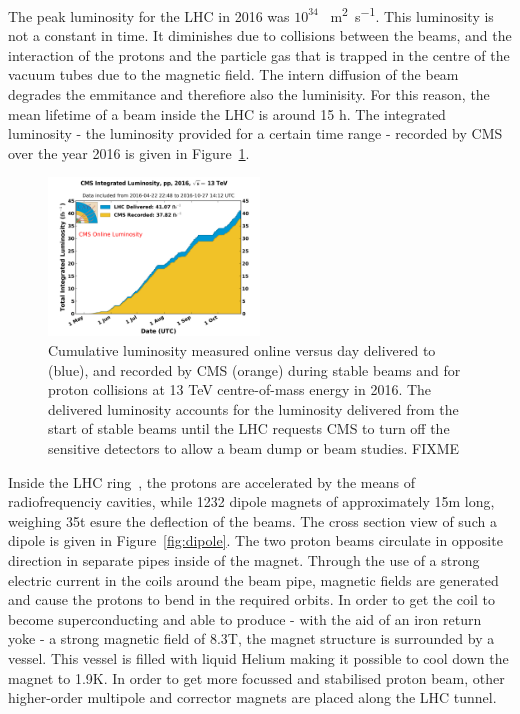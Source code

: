 The peak luminosity for the LHC in 2016 was $10^{34}$ \si{\per\square\meter \per\second }. This luminosity is not a constant in time. It diminishes due to collisions between the beams, and the interaction of the protons and the particle gas that is trapped in the centre of the vacuum tubes due to the magnetic field. The intern diffusion of the beam degrades the emmitance and therefiore also the luminisity. For this reason, the mean lifetime of a beam inside the LHC is around 15 \si{ \hour}. The integrated luminosity - the luminosity provided for a certain time range - recorded by CMS over the year 2016 is given in Figure~\ref{fig:IntLumi}.
 \begin{figure}[h]
	\centering
	\includegraphics[width=0.5\textwidth]{2_ExperimentalSetup/Figures/int_lumi_per_day_cumulative_pp_2016OnlineLumi}
	\caption{Cumulative luminosity measured online versus day delivered to (blue), and recorded by CMS (orange) during stable beams and for proton collisions at 13 TeV centre-of-mass energy in 2016. The delivered luminosity accounts for the luminosity delivered from the start of stable beams until the LHC requests CMS to turn off the sensitive detectors to allow a beam dump or beam studies. FIXME}
	\label{fig:IntLumi}
\end{figure}

 
Inside the LHC ring~\cite{Bruning:782076}, the protons are accelerated by the means of radiofrequenciy cavities, while 1232 dipole magnets of approximately 15\si{ \m} long, weighing 35\si{ \tonne} esure the deflection of the beams. The cross section view of such a dipole is given in Figure~\ref{fig:dipole}. The two proton beams circulate in opposite direction in separate pipes inside of the magnet. Through the use of a strong electric current in the coils around the beam pipe, magnetic fields are generated and cause the protons to bend in the required orbits. In order to get the coil to become superconducting and able to produce - with the aid of an iron return yoke - a strong magnetic field of 8.3\si{ \tesla}, the magnet structure is surrounded by a vessel. This vessel is filled with liquid Helium making it possible to cool down the magnet to 1.9\si{ \kelvin}. In order to get more focussed and stabilised proton beam, other higher-order multipole and corrector magnets are placed along the LHC tunnel.

